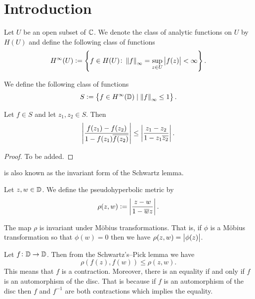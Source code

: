 \documentclass[11pt,a4paper]{article}
\begin{document}
\maketitle



\newpage
\tableofcontents
\newpage

\section{Introduction}
\begin{definition}
  Let $U$ be an open subset of $\mathbb{C}$.
  We denote the class of analytic functions on $U$
  by $H(U)$ and define the following class of functions
  \[
    H^{\infty}(U) :=
    \left\{f \in H(U) \colon \left\lVert f\right\rVert_{\infty} = \sup_{z \in U}
    \left\lvert f(z)\right\rvert < \infty\right\}.
  \]
\end{definition}

\begin{definition}
  We define the following class of functions
  \[
    S := \left\{f \in H^{\infty}(\mathbb{D}) \mid \left\lVert f\right\rVert_{\infty} \le 1\right\}.
  \]
\end{definition}

\begin{proposition}
  \label{prop:schwartz-pick}
  Let $f \in S$ and let $z_1,z_2 \in S$.
  Then
  \[
    \left\lvert\frac{f(z_1) - f(z_2)}{1 - f(z_1) \overline{f(z_2)}}\right\rvert \le
    \left\lvert\frac{z_1 - z_2}{1 - z_1 \overline{z_2}}\right\rvert.
  \]
\end{proposition}
\begin{proof}
  To be added.
\end{proof}
\begin{remark}
   is also known as the invariant form of
  the Schwartz lemma.
\end{remark}

\begin{definition}
  Let $z,w \in \mathbb{D}$.
  We define the pseudohyperbolic metric by
  \[
    \rho(z,w) := \left\lvert\frac{z - w}{1 - \overline{w} z}\right\rvert.
  \]
\end{definition}
\begin{remark}
  The map $\rho$ is invariant under M\"obius transformations.
  That is, if $\phi$ is a M\"obius transformation so that $\phi(w) = 0$
  then we have $\rho(z,w) = \left\lvert\phi(z)\right\rvert$.
\end{remark}

\begin{remark}
  Let $f \colon \mathbb{D} \to \mathbb{D}$.
  Then from the Schwartz's--Pick lemma we have
  \[
    \rho(f(z),f(w)) \le \rho(z,w).
  \]
  This means that $f$ is a contraction.
  Moreover, there is an equality if and only if $f$ is
  an automorphism of the disc.
  That is because if $f$ is an automorphism of the disc then $f$ and
  $f^{-1}$ are both contractions which implies the equality.
\end{remark}
\end{document}
